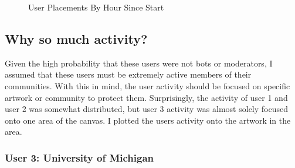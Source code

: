 \begin{figure}[H]
{\begin{minipage}{0.315\textwidth}
        \end{minipage}
    }
    \caption{User Placements By Hour Since Start}
\end{figure}

\subsection{Why so much activity?}
Given the high probability that these users were not bots or moderators, I assumed that these users must be extremely active members of their communities. With this in mind, the user activity should be focused on specific artwork or community to protect them. Surprisingly, the activity of user 1 and user 2 was somewhat distributed, but user 3 activity was almost solely focused onto one area of the canvas. I plotted the users activity onto the artwork in the area.

\subsubsection{User 3: University of Michigan}

